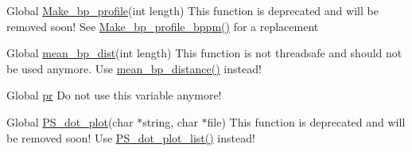 \label{deprecated__deprecated000018}
\hypertarget{deprecated__deprecated000018}{}
 
\begin{DoxyDescription}
\item[Global \hyperlink{profiledist_8h_a904c7eaf4a2413567c00ac4891749d18}{Make\_\-bp\_\-profile}(int length) ]This function is deprecated and will be removed soon! See \hyperlink{profiledist_8h_a3dff26e707a2a2e65a0f759caabde6e7}{Make\_\-bp\_\-profile\_\-bppm()} for a replacement


\end{DoxyDescription}

\label{deprecated__deprecated000013}
\hypertarget{deprecated__deprecated000013}{}
 
\begin{DoxyDescription}
\item[Global \hyperlink{part__func_8h_ae9556ba7ded44fe2321b6f67c3fc02a3}{mean\_\-bp\_\-dist}(int length) ]This function is not threadsafe and should not be used anymore. Use \hyperlink{part__func_8h_a79cbc375af65f11609feb6b055269e7d}{mean\_\-bp\_\-distance()} instead! 
\end{DoxyDescription}

\label{deprecated__deprecated000009}
\hypertarget{deprecated__deprecated000009}{}
 
\begin{DoxyDescription}
\item[Global \hyperlink{fold__vars_8h_ac98ec419070aee6831b44e5c700f090f}{pr} ]Do not use this variable anymore! 
\end{DoxyDescription}

\label{deprecated__deprecated000019}
\hypertarget{deprecated__deprecated000019}{}
 
\begin{DoxyDescription}
\item[Global \hyperlink{PS__dot_8h_a689a97a7e3b8a2df14728b8204d9d57b}{PS\_\-dot\_\-plot}(char $\ast$string, char $\ast$file) ]This function is deprecated and will be removed soon! Use \hyperlink{PS__dot_8h_a00ea223b5cf02eb2faae5ff29f0d5e12}{PS\_\-dot\_\-plot\_\-list()} instead! 
\end{DoxyDescription}